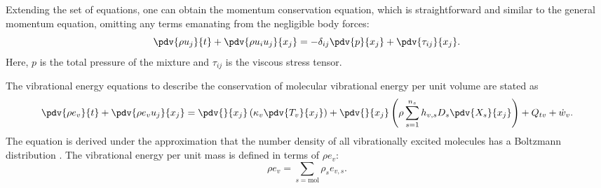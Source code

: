 Extending the set of equations, one can obtain the momentum conservation equation, which is straightforward and similar to the general momentum equation, omitting any terms emanating from the negligible body forces:
\begin{equation}\label{equation:global_momentum}
    \pdv{\rho u_j}{t} + \pdv{\rho u_{i} u_{j}}{x_{j}}  = - \delta_{ij} \pdv{p}{x_{j}} + \pdv{\tau_{ij}}{x_{j}}.
\end{equation}
Here, $p$ is the total pressure of the mixture and $\tau_{ij}$ is the viscous stress tensor.

The vibrational energy equations to describe the conservation of molecular vibrational energy per unit volume are stated as
\begin{equation}\label{equation:conservation_vibration}
\begin{split}
\pdv{\rho e_{v}}{t} + \pdv{\rho e_{v} u_j}{x_j} = \pdv{}{x_j} \left( \kappa_{v} \pdv{T_v}{x_j} \right) + \pdv{}{x_j} \left( \rho \sum^{n_s}_{s=1} h_{v,s} D_s \pdv{X_s}{x_j} \right) + Q_{tv} + \dot{w}_{v}.
\end{split}
\end{equation}
The equation is derived under the approximation that the number density of all vibrationally excited molecules has a Boltzmann distribution \citep{Gnoffo1989}. The vibrational energy per unit mass is defined in terms of $\rho e_v$:
\begin{equation}
    \rho e_v = \sum_{s=\mathrm{mol}} \rho_s e_{v,s}.
\end{equation}




